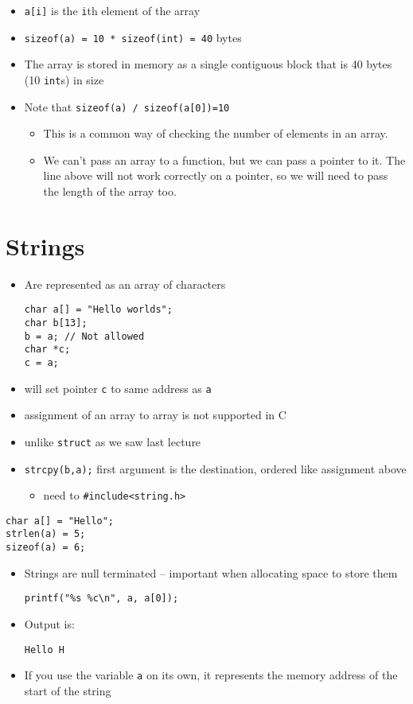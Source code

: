 \documentclass{article}
\begin{document}
\begin{itemize}
\item \verb!a[i]! is the \verb!i!th element of the array
\item \verb!sizeof(a) = 10 * sizeof(int) = 40! bytes
\item The array is stored in memory as a single contiguous block that is 40 bytes (10 \verb!int!s) in size

\item Note that \verb!sizeof(a) / sizeof(a[0])=10!
\begin{itemize}
\item This is a common way of checking the number of elements in an array.
\item We can't pass an array to a function, but we can pass a pointer to it. The line above will not work correctly on a pointer, so we will need to pass the length of the array too.
\end{itemize}
\end{itemize}



\section{Strings}
\begin{itemize}
\item Are represented as an array of characters
\begin{verbatim}
char a[] = "Hello worlds";
char b[13];
b = a; // Not allowed
char *c;
c = a;
\end{verbatim}
\item will set pointer \verb!c! to same address as \verb!a!
\item assignment of an array to array is not supported in C
\item unlike \verb!struct! as we saw last lecture
\item \verb!strcpy(b,a);!  first argument is the destination, ordered like assignment above
\begin{itemize}
\item need to \verb!#include<string.h>!
\end{itemize}
\end{itemize}




\begin{verbatim}
char a[] = "Hello";
strlen(a) = 5;
sizeof(a) = 6;
\end{verbatim}

\begin{itemize}
\item Strings are null terminated -- important when allocating space to store them
\begin{verbatim}
printf("%s %c\n", a, a[0]);
\end{verbatim}
\item Output is:
\begin{verbatim}
Hello H
\end{verbatim}

\item If you use the variable \verb!a! on its own, it represents the memory address of the start of the string
\end{itemize}
\end{document}
